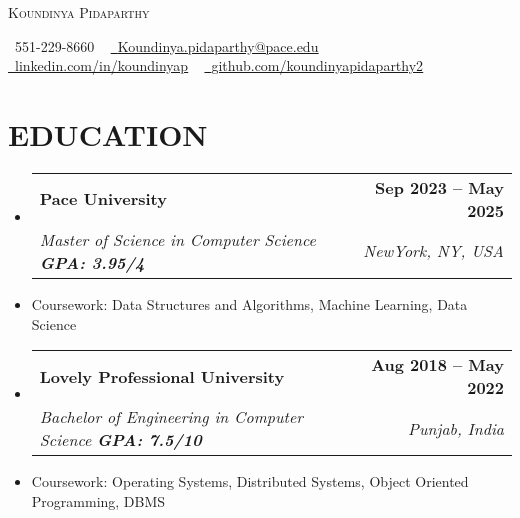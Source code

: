 \documentclass[letterpaper,11pt]{article}
\makeatletter
\newcommand{\resumeSubheading}[4]{
  \vspace{-2pt}\item
    \begin{tabular*}{1.0\textwidth}[t]{l@{\extracolsep{\fill}}r}
      \textbf{#1} & \textbf{\small #2} \\
      \textit{\small#3} & \textit{\small #4} \\
    \end{tabular*}\vspace{-7pt}
}
\newcommand{\resumeSubHeadingListStart}{\begin{itemize}}
\newcommand{\resumeSubHeadingListEnd}{\end{itemize}}
\makeatother
\begin{document}

\begin{center}
    {\Huge \scshape Koundinya Pidaparthy} \\ \vspace{1pt}
    
    \small \raisebox{-0.1\height}\faPhone\ 551-229-8660 ~ \href{mailto:x@gmail.com}{\raisebox{-0.2\height}\faEnvelope\  \underline{Koundinya.pidaparthy@pace.edu}} ~ 
    \href{https://linkedin.com/in//}{\raisebox{-0.2\height}\faLinkedin\ \underline{linkedin.com/in/koundinyap}}  ~
    \href{https://github.com/}{\raisebox{-0.2\height}\faGithub\ \underline{github.com/koundinyapidaparthy2}}
    \vspace{-8pt}
\end{center}


\section{EDUCATION}
  \resumeSubHeadingListStart
    \resumeSubheading
      {Pace University}{Sep 2023 -- May 2025}
      {\textnormal{Master of Science in Computer Science \textbf{GPA: 3.95/4}}}{NewYork, NY, USA}
      \vspace{-6pt}
        \item[]{Coursework:} Data Structures and Algorithms, Machine Learning, Data Science
       

    \resumeSubheading
      {Lovely Professional University}{Aug 2018 -- May 2022}
      {\textnormal{Bachelor of Engineering in Computer Science \textbf{GPA: 7.5/10}}}{Punjab, India}
      \vspace{-6pt}
        \item[]{Coursework:} Operating Systems, Distributed Systems, Object Oriented Programming, DBMS
  \resumeSubHeadingListEnd
\end{document}
